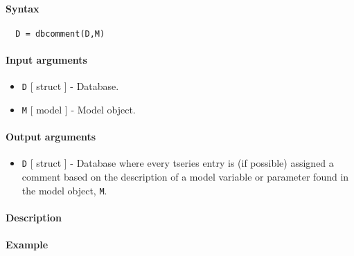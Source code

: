 


	\paragraph{Syntax}
 
 \begin{verbatim}
  D = dbcomment(D,M)
 \end{verbatim}
 
 \paragraph{Input arguments}
 
 \begin{itemize}
 \item
   \texttt{D} {[} struct {]} - Database.
 \item
   \texttt{M} {[} model {]} - Model object.
 \end{itemize}
 
 \paragraph{Output arguments}
 
 \begin{itemize}
 \item
   \texttt{D} {[} struct {]} - Database where every tseries entry is (if
   possible) assigned a comment based on the description of a model
   variable or parameter found in the model object, \texttt{M}.
 \end{itemize}
 
 \paragraph{Description}
 
 \paragraph{Example}


